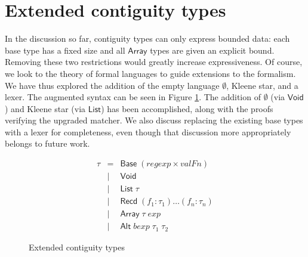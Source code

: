 \documentclass[a4paper,UKenglish,cleveref, autoref, thm-restate]{lipics-v2021}
\newcommand{\konst}[1]{\ensuremath{\mathsf{#1}}}
\begin{document}

\section{Extended contiguity types}

In the discussion so far, contiguity types can only express bounded
data: each base type has a fixed size and all \konst{Array} types are
given an explicit bound. Removing these two restrictions would greatly
increase expressiveness. Of course, we look to the theory of formal
languages to guide extensions to the formalism. We have thus explored
the addition of the empty language $\emptyset$, Kleene star, and a
lexer. The augmented syntax can be seen in Figure
\ref{gen-contig-types}. The addition of $\emptyset$ (via \konst{Void})
and Kleene star (via \konst{List}) has been accomplished, along with
the proofs verifying the upgraded matcher. We also discuss replacing
the existing base types with a lexer for completeness, even though that
discussion more appropriately belongs to future work.

\begin{figure}
\[
\begin{array}{rcl}
 \tau & =    & \konst{Base}\; (\mathit{regexp} \times \mathit{valFn}) \\
      & \mid & \konst{Void} \\
      & \mid & \konst{List}\; \tau \\
      & \mid & \konst{Recd}\; (f_1 : \tau_1) \ldots (f_n : \tau_n) \\
      & \mid & \konst{Array}\; \tau \; \mathit{exp} \\
      & \mid & \konst{Alt}\; \mathit{bexp} \; \tau_1\; \tau_2
\end{array}
\]
\caption{Extended contiguity types}
\label{gen-contig-types}
\end{figure}
\end{document}
